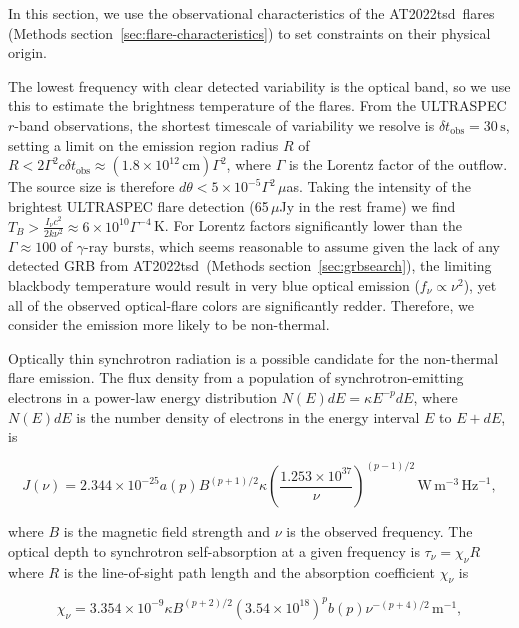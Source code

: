 \documentclass{nature_plusfigure}
\newcommand{\at}{AT2022tsd}
\begin{document}
\begin{methods}
In this section, we use the observational characteristics of the \at\ flares (Methods section~\ref{sec:flare-characteristics}) to set constraints on their physical origin.

The lowest frequency with clear detected variability is the optical band, so we use this to estimate the brightness temperature of the flares.
From the ULTRASPEC $r$-band observations, the shortest timescale of variability we resolve is $\delta t_\mathrm{obs} = 30\,\mathrm{s}$, setting a limit on the emission region radius $R$ of\cite{Rybicki1986} $R<2\Gamma^2 c \delta t_\mathrm{obs} \approx (1.8\times10^{12}\,\mathrm{cm}) \Gamma^2$, where $\Gamma$ is the Lorentz factor of the outflow. 
The source size is therefore $d\theta < 5 \times 10^{-5} \Gamma^2 \,\mu$as. Taking the intensity of the brightest ULTRASPEC flare detection (65\,$\mu$Jy in the rest frame) we find $T_B > \frac{I_\nu c^2}{2 k\nu^2} \approx 6\times10^{10} \Gamma^{-4} \,$K.
For Lorentz factors significantly lower than the $\Gamma\approx100$ of $\gamma$-ray bursts, which seems reasonable to assume given the lack of any detected GRB from \at\ (Methods section~\ref{sec:grbsearch}), the limiting blackbody temperature would result in very blue optical emission ($f_\nu\propto\nu^2$), yet all of the observed optical-flare colors are significantly redder.
Therefore, we consider the emission more likely to be non-thermal.

Optically thin synchrotron radiation is a possible candidate for the non-thermal flare emission. The flux density from a population of synchrotron-emitting electrons in a power-law energy distribution $N(E)dE = \kappa E^{-p} dE$, where $N(E)dE$ is the number density of electrons in the energy interval $E$ to $E+dE$, is\cite{Longair2011}

\begin{equation}
\label{eq:synchrotron-flux}
J(\nu) = 2.344\times10^{-25} a(p) B^{(p+1)/2} \kappa \left( \frac{1.253\times10^{37}}{\nu} \right)^{(p-1)/2}\,\mathrm{W}\,\mathrm{m}^{-3}\,\mathrm{Hz}^{-1},
\end{equation}

\noindent where $B$ is the magnetic field strength and $\nu$ is the observed frequency. The optical depth to synchrotron self-absorption at a given frequency is $\tau_\nu = \chi_\nu R$ where $R$ is the line-of-sight path length and the absorption coefficient $\chi_\nu$ is

\begin{equation}
\label{eq:synchrotron-tau}
\chi_\nu = 3.354\times10^{-9} \kappa B^{(p+2)/2} (3.54\times10^{18})^p b(p) \nu^{-(p+4)/2}\,\mathrm{m}^{-1},
\end{equation}


\end{methods}
\end{document}
